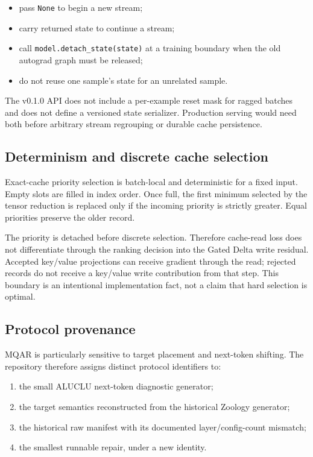 \begin{itemize}
  \item pass \texttt{None} to begin a new stream;
  \item carry returned state to continue a stream;
  \item call \texttt{model.detach\_state(state)} at a training boundary when
  the old autograd graph must be released;
  \item do not reuse one sample's state for an unrelated sample.
\end{itemize}

The v0.1.0 API does not include a per-example reset mask for ragged batches and
does not define a versioned state serializer. Production serving would need
both before arbitrary stream regrouping or durable cache persistence.

\subsection{Determinism and discrete cache selection}

Exact-cache priority selection is batch-local and deterministic for a fixed
input. Empty slots are filled in index order. Once full, the first minimum
selected by the tensor reduction is replaced only if the incoming priority is
strictly greater. Equal priorities preserve the older record.

The priority is detached before discrete selection. Therefore cache-read loss
does not differentiate through the ranking decision into the Gated Delta
write residual. Accepted key/value projections can receive gradient through
the read; rejected records do not receive a key/value write contribution from
that step. This boundary is an intentional implementation fact, not a claim
that hard selection is optimal.

\subsection{Protocol provenance}

MQAR is particularly sensitive to target placement and next-token shifting.
The repository therefore assigns distinct protocol identifiers to:

\begin{enumerate}
  \item the small ALUCLU next-token diagnostic generator;
  \item the target semantics reconstructed from the historical Zoology
  generator;
  \item the historical raw manifest with its documented layer/config-count
  mismatch;
  \item the smallest runnable repair, under a new identity.
\end{enumerate}

